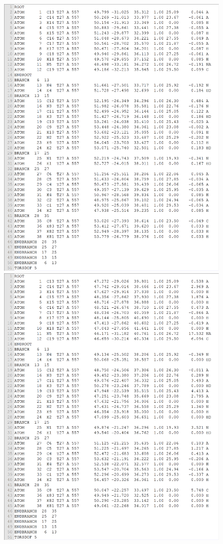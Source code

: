 \begin{figure}
\centering
\includegraphics[width=1.36\textwidth,natwidth=1899,natheight=2350]{../usrt/T27CrystalPDBQT.png}
\endminipage
{}
\centering
\includegraphics[width=1.36\textwidth,natwidth=1899,natheight=2350]{../usrt/T27DockedPDBQT.png}

\end{figure}
